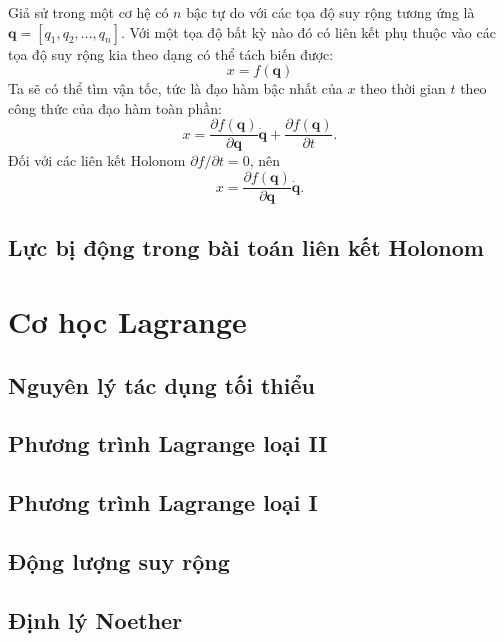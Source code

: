 Giả sử trong một cơ hệ có $n$ bậc tự do với các tọa độ suy rộng tương ứng là $\mathbf{q} = [q_1,q_2,...,q_n]$. Với một tọa độ bất kỳ nào đó có liên kết phụ thuộc vào các tọa độ suy rộng kia theo dạng có thể tách biến được:
\begin{equation*}
    x = f(\mathbf{q})
\end{equation*}
Ta sẽ có thể tìm vận tốc, tức là đạo hàm bậc nhất của $x$ theo thời gian $t$ theo công thức của đạo hàm toàn phần:
\begin{equation}
    x = \dfrac{\partial f(\mathbf{q})}{\partial \mathbf{q}} \mathbf{\dot{q}} + \dfrac{\partial f (\mathbf{q})}{\partial t}.
\end{equation}
Đối với các liên kết Holonom \(\partial f/ \partial t = 0\), nên 
\begin{equation}
    x = \dfrac{\partial f(\mathbf{q})}{\partial \mathbf{q}} \mathbf{\dot{q}}.
\end{equation}
\subsection{Lực bị động trong bài toán liên kết Holonom}


\section{Cơ học Lagrange}

\subsection{Nguyên lý tác dụng tối thiểu}

\subsection{Phương trình Lagrange loại II}

\subsection{Phương trình Lagrange loại I}

\subsection{Động lượng suy rộng}

\subsection{Định lý Noether}


